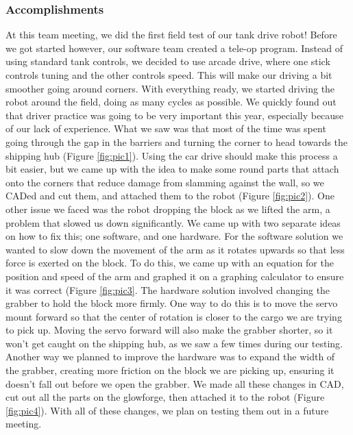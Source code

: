\subsubsection*{Accomplishments}
At this team meeting, we did the first field test of our tank drive robot!  Before we got started however, our software team created a tele-op program. Instead of using standard tank controls, we decided to use arcade drive, where one stick controls tuning and the other controls speed. This will make our driving a bit smoother going around corners. With everything ready, we started driving the robot around the field, doing as many cycles as possible. We quickly found out that driver practice was going to be very important this year, especially because of our lack of experience. What we saw was that most of the time was spent going through the gap in the barriers and turning the corner to head towards the shipping hub (Figure \ref{fig:pic1}). Using the car drive should make this process a bit easier, but we came up with the idea to make some round parts that attach onto the corners that reduce damage from slamming against the wall, so we CADed and cut them, and attached them to the robot (Figure \ref{fig:pic2}). 
One other issue we faced was the robot dropping the block as we lifted the arm, a problem that slowed us down significantly. We came up with two separate ideas on how to fix this; one software, and one hardware. For the software solution we wanted to slow down the movement of the arm as it rotates upwards so that less force is exerted on the block. To do this, we came up with an equation for the position and speed of the arm and graphed it on a graphing calculator to ensure it was correct (Figure \ref{fig:pic3}. The hardware solution involved changing the grabber to hold the block more firmly. One way to do this is to move the servo mount forward so that the center of rotation is closer to the cargo we are trying to pick up. Moving the servo forward will also make the grabber shorter, so it won't get caught on the shipping hub, as we saw a few times during our testing.  Another way we planned to improve the hardware was to expand the width of the grabber, creating more friction on the block we are picking up, ensuring it doesn’t fall out before we open the grabber. We made all these changes in CAD, cut out all the parts on the glowforge, then attached it to the robot (Figure \ref{fig:pic4}). With all of these changes, we plan on testing them out in a future meeting.
 

